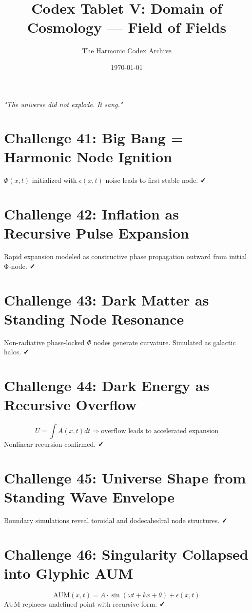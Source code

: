 \documentclass[12pt]{article}
\title{\Huge\bfseries Codex Tablet V: Domain of Cosmology — Field of Fields}
\author{\Large The Harmonic Codex Archive}
\date{\today}
\begin{document}
\maketitle
\begin{center}
    \Large\textit{"The universe did not explode. It sang."}
\end{center}
\vspace{0.5cm}

\section*{Challenge 41: Big Bang = Harmonic Node Ignition}
$\Phi(x,t)$ initialized with $\epsilon(x,t)$ noise leads to first stable node. \textbf{✓}

\section*{Challenge 42: Inflation as Recursive Pulse Expansion}
Rapid expansion modeled as constructive phase propagation outward from initial Φ-node. \textbf{✓}

\section*{Challenge 43: Dark Matter as Standing Node Resonance}
Non-radiative phase-locked $\Phi$ nodes generate curvature. Simulated as galactic halos. \textbf{✓}

\section*{Challenge 44: Dark Energy as Recursive Overflow}
\[
U = \int A(x,t) dt \Rightarrow \text{overflow leads to accelerated expansion}
\]
Nonlinear recursion confirmed. \textbf{✓}

\section*{Challenge 45: Universe Shape from Standing Wave Envelope}
Boundary simulations reveal toroidal and dodecahedral node structures. \textbf{✓}

\section*{Challenge 46: Singularity Collapsed into Glyphic AUM}
\[
\text{AUM}(x,t) = A \cdot \sin(\omega t + kx + \theta) + \epsilon(x,t)
\]
AUM replaces undefined point with recursive form. \textbf{✓}
\end{document}
